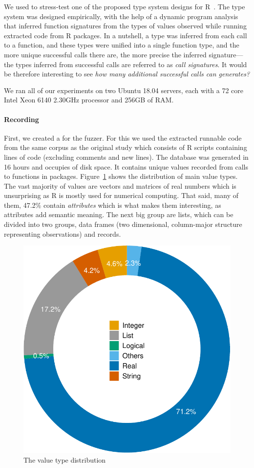 \documentclass[sigplan,anonymous,review]{acmart}
\begin{document}
We used \tool to stress-test one of the proposed type system designs for R~\cite{turcotte2020designing}.
The type system was designed empirically, with the help of a dynamic program analysis that inferred function signatures from the types of values observed while running extracted code from R packages.
In a nutshell, a type was inferred from each call to a function, and these types were unified into a single function type, and the more unique successful calls there are, the more precise the inferred signature---the types inferred from successful calls are referred to as \textit{call signatures}.
It would be therefore interesting to see \emph{how many additional successful calls can \tool generates?}

We ran all of our experiments on two Ubuntu 18.04 servers, each with a 72 core Intel Xeon 6140 2.30GHz processor and 256GB of RAM.

\paragraph{Recording}

First, we created a \sxpdb for the fuzzer.
For this we used the extracted runnable code from the same corpus as the original study which consists of \DBNumSourceFiles R scripts containing \DBSourceLinesOfCodeRnd lines of code (excluding comments and new lines).
The database was generated in 16 hours and occupies \DBFileSize of disk space.
It contains \DBValuesRnd unique values recorded from \DBNumCallsRnd calls to \DBNumFunctionsRnd functions in \DBNumPackages packages.
Figure~\ref{fig:argsdb-value-distribution} shows the distribution of main value types.
The vast majority of values are vectors and matrices of real numbers which is unsurprising as R is mostly used for numerical computing.
That said, many of them, 47.2\%  contain \textit{attributes} which is what makes them interesting, as attributes add semantic meaning.
The next big group are lists, which can be divided into two groups, data frames (two dimensional, column-major structure representing observations) and records.

\begin{figure}
    \centering
    \includegraphics[width=.6\columnwidth]{code-and-figures/argsdb-value-distribution.pdf}
    \vspace{-3mm}
    \caption{The \sxpdb value type distribution}
    \label{fig:argsdb-value-distribution}
\end{figure}
\end{document}
